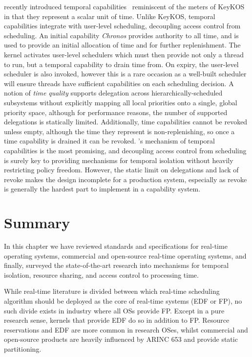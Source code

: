\composite recently introduced temporal capabilities~\citep{Gadepalli_GBKP_17} reminiscent of
the meters of KeyKOS in that they represent a scalar unit of time. 
Unlike KeyKOS, temporal capabilities integrate with user-level scheduling, decoupling access control
from scheduling. An initial capability \emph{Chronos} provides authority to all time, and is used to
provide an initial allocation of time and for further replenishment. 
The kernel activates user-level schedulers 
which must then provide not only a thread to run, but a temporal capability to drain time from.
On expiry, the user-level scheduler is also
invoked, however this is a rare occasion as a well-built scheduler will ensure threads have
sufficient capabilities on each scheduling decision.
 A notion of \emph{time quality} supports delegation across
hierarchically-scheduled subsystems without explicitly mapping all
local priorities onto a single, global priority space, although for performance reasons, the number
of supported delegations is statically limited.
Additionally, time capabilities cannot be revoked unless empty, although the time they represent is
non-replenishing, so once a time capability is drained it can be revoked. 
\composite's mechanism of temporal capabilities is the most promising, and decoupling access
control from scheduling is surely key to providing mechanisms for temporal isolation without 
heavily restricting policy freedom. However, the static limit on delegations and lack of revoke
makes the design incomplete for a production system, especially as revoke is generally the hardest part to
implement in a capability system. 

\section{Summary}

In this chapter we have reviewed standards and specifications for real-time operating systems,
commercial and open-source real-time operating systems, and finally, surveyed the state-of-the-art
research into mechanisms for temporal isolation, resource sharing, and access control to processing
time.

While real-time literature is divided between which real-time scheduling algorithm should be
deployed as the core of real-time systems (\gls{EDF} or \gls{FP}), no such divide exists in industry
where all \glspl{OS} provide \gls{FP}. 
Except in a pure research sense, kernels that provide
\gls{EDF} do so in addition to \gls{FP}.  Resource reservations and \gls{EDF} are more common in
research OSes, whilst commercial and open-source products are heavily influenced by ARINC 653 and
provide static partitioning. 
 
